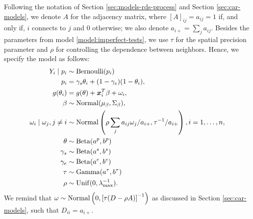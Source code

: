 Following the notation of Section \ref{sec:models-rds-process} and Section
\ref{sec:car-models}, we denote $A$ for the adjacency matrix, where $[A]_{ij}
  =a_{ij} = 1$ if, and only if, $i$ connects to $j$ and $0$ otherwise; we also
denote $a_{i+} = \sum_j a_{ij}$. Besides the
parameters from model \ref{model:imperfect-tests}, we use $\tau$
for the spatial precision parameter and $\rho$ for controlling the dependence between neighbors. Hence, we specify
the model as follows:
\begin{equation}
  \label{model:imperfect-tests-rds}
  \begin{aligned}
    Y_i \mid p_i                     & \sim \operatorname{Bernoulli}(p_i)                                                                               \\
    p_i                              & = \gamma_s\theta_i + (1-\gamma_e)(1 - \theta_i),                                              \\
    g(\theta_i)                      & = g(\theta) + \boldsymbol{x}_i^T\beta + \omega_i,                                                         \\
    \beta                            & \sim \operatorname{Normal}(\mu_{\beta}, \Sigma_{\beta}),                                                         \\
    \omega_i \mid \omega_j, j \neq i & \sim \operatorname{Normal}\left(\rho\sum_j a_{ij} \omega_j / a_{i+}, \tau^{-1} / a_{i+}\right), i = 1, \dots, n,
    \\
    \theta                           & \sim \operatorname{Beta}(a^p, b^p)                                                                      \\
    \gamma_s                         & \sim \operatorname{Beta}(a^s, b^s)                                                                      \\
    \gamma_e                         & \sim \operatorname{Beta}(a^e, b^e)                                                                      \\
    \tau                             & \sim \operatorname{Gamma}(a^{\tau}, b^{\tau})                                                 \\
    \rho                             & \sim \operatorname{Unif}(0,\lambda_{\max}^{-1}).
  \end{aligned}
\end{equation}
We remind that $\omega \sim \operatorname{Normal}\left(0, \left[\tau (D - \rho
      A)\right]^{-1}\right)$ as discussed in Section \ref{sec:car-models}, such that
$D_{ii} = a_{i+}$.

